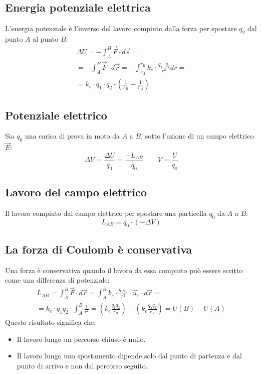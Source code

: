 \subsection{Energia potenziale elettrica}
L'energia potenziale è l'inverso del lavoro compiuto dalla forza per spostare $q_2$ dal punto $A$ al punto $B$.
	\begin{displaymath}\begin{aligned}
		\Delta U = - \int_A^B \vec{F} \cdot d\vec{s} = \\
        = - \int_A^B \vec{F} \cdot d\vec{r} = -\int_{r_A}^{r_B} k_e \cdot \frac{q_1 \cdot q_2}{r^2} dr =\\
        = k_e\cdot q_1 \cdot q_2 \cdot  \left(\frac{1}{r_B} - \frac{1}{r_A}\right)
	\end{aligned}\end{displaymath}

\subsection{Potenziale elettrico}
Sia $q_0$ una carica di prova in moto da $A$ a $B$, sotto l'azione di un campo elettrico $\vec{E}$:
	\begin{displaymath}
		\Delta V= \frac{\Delta U}{q_0} = \frac{-L_{AB}}{q_0} \qquad V = \frac{U}{q_0}
	\end{displaymath}

\subsection{Lavoro del campo elettrico}
Il lavoro compiuto dal campo elettrico per spostare una particella $q_0$ da $A$ a $B$:
\begin{displaymath}
	L_{AB} = q_0 \cdot (-\Delta V)		
\end{displaymath}


\subsection{La forza di Coulomb è conservativa}
Una forza è conservativa quando il lavoro da essa compiuto può essere scritto come una differenza di potenziale:
\begin{displaymath}\begin{aligned}
	L_{AB} = \int_A^B \vec{F} \cdot d\vec{r} = \int_A^B k_e \cdot \frac{q_1q_2}{r^2} \cdot \vec{u}_r \cdot d\vec{r} =\\
    = k_e \cdot q_1q_2 \cdot \int_A^B \frac{1}{r^2} = \left( k_e \frac{q_1q_2}{r_B}\right) - \left(k_e\frac{q_1q_2}{r_A}\right) = U(B) - U(A)
\end{aligned}\end{displaymath}
Questo risultato significa che:
\begin{itemize}
	\item{Il lavoro lungo un percorso chiuso è nullo.}
    \item{Il lavoro lungo uno spostamento dipende solo dal punto di partenza e dal punto di arrivo e non dal percorso seguito.}
\end{itemize}

